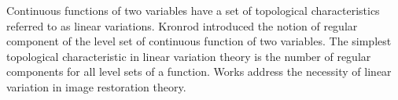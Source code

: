 \documentclass[hidelinks]{llncs}
\newcommand*{\N}{\mathbb{N} \xspace}
\begin{document}
\begin{comment}
Let $w$ be a binary discrete function $w=(w_{i,j})$, where $w_{i,j} \in
\{0,1\}$, for all pairs $(i,j)$. A subset of such pairs $(i, j)$ when
$w_{i,j}=1$ and all elements of the subset are connected by the 8-connectivity,
is called the connected component of the binary function $w$.
For a number $k \in \N$ and a discrete function $u$ we define the following
indicator function $\chi$:
\begin{equation}
  \chi_k (u_{i,j}) =
    \begin{cases}
      1, & u_{i,j} \ge k \\
      0, & u_{i,j} < k
    \end{cases}.
  \label{eq:chiIndicator}
\end{equation}

\begin{definition}
  The number $V_k(u_{i,j})$ of connected components for a level $k$, $k \in \N$
  of the discrete function $u$ is called the number of connected components of
  the binary discrete function $\chi_k(u_{i,j})$.
\end{definition}

\begin{definition}
  The linear variation $V(u_{i,j})$ of a discrete function  is defined as
  follows:
  \begin{equation}
    V(u_{i,j}) = \sum_{k=0}^{+\infty} V_k(u_{i,j})
    \label{eq:V}
  \end{equation}
\end{definition}

Let us compute the discrete gradient $\nabla u_{i,j}$ of $u$ at $(i,j)$ as
\begin{equation}
  \nabla u_{i,j} = (u_{i+1,j} - u_{i,j}, u_{i,j+1} - u_{i,j}).
  \label{eq:gradient}
\end{equation}

Suppose that if the pair $(i,j)$ is outside of the domain of the function $u$,
then $u_{i,j} = 0$.
The main problem of the computer implementation of the linear variation is 
computation of $V_k(u_{i,j})$ for given k.

\end{comment}

Continuous functions of two variables have a set of topological characteristics
referred to as linear variations. Kronrod\cite{mak2} introduced the notion of
regular component of the level set of continuous function of two variables.
The simplest topological characteristic in linear variation theory is the number
of regular components for all level sets of a function. Works
\cite{mak3,mak4,mak5} address the necessity of linear variation in image
restoration theory.
\end{document}
